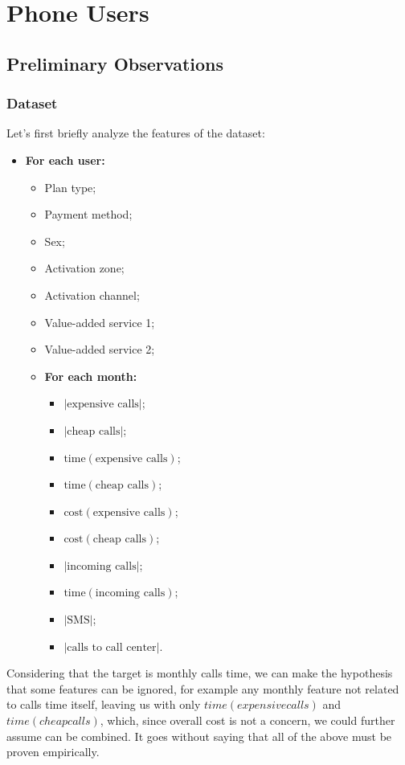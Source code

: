 \section{Phone Users}

\subsection{Preliminary Observations}

\subsubsection{Dataset}

Let's first briefly analyze the features of the dataset:
\begin{itemize}
\small
  \item \textbf{For each user:}
  \begin{itemize}
    \item Plan type;
    \item Payment method;
    \item Sex;
    \item Activation zone;
    \item Activation channel;
    \item Value-added service 1;
    \item Value-added service 2;
    \item \textbf{For each month:}
    \begin{itemize}
      \item $|\text{expensive calls}|$;
      \item $|\text{cheap calls}|$;
      \item $\text{time}(\text{expensive calls})$;
      \item $\text{time}(\text{cheap calls})$;
      \item $\text{cost}(\text{expensive calls})$;
      \item $\text{cost}(\text{cheap calls})$;
      \item $|\text{incoming calls}|$;
      \item $\text{time}(\text{incoming calls})$;
      \item $|\text{SMS}|$;
      \item $|\text{calls to call center}|$.
    \end{itemize}
  \end{itemize}
\end{itemize}

Considering that the target is monthly calls time, we can make the hypothesis that some features can be ignored, for example any monthly feature not related to calls time itself, leaving us with only $time(expensive calls)$ and $time(cheap calls)$, which, since overall cost is not a concern, we could further assume can be combined. It goes without saying that all of the above must be proven empirically.

